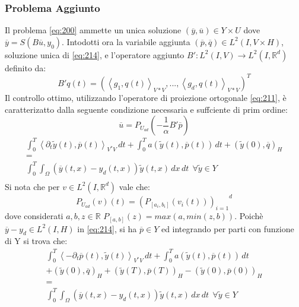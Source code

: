 \subsubsection{Problema Aggiunto}
Il problema \ref{eq:200} ammette un unica soluzione $(\overline{y},\overline{u}){\in}Y{\times}U$ dove $\overline{y}=S(B\overline{u},y_0)$.
Intodotti ora la variabile aggiunta $(\overline{p},\overline{q}) \in L^2(I,V{\times}H)$, soluzione unica di \ref{eq:214}, e l'operatore aggiunto $B':L^2(I,V){\rightarrow}L^2(I,\mathbb{R}^d)$ definito da:
\begin{equation}
B'q(t) = ( \left \langle g_1,q(t) \right \rangle_{V*V}, . . . ,\left \langle g_d,q(t) \right \rangle_{V*V})^T
\label{eq:212}
\end{equation}
Il controllo ottimo, utilizzando l'operatore di proiezione ortogonale \ref{eq:211}, è caratterizatto dalla seguente condizione necessaria e suffciente di prim ordine:
\begin{equation}
\overline{u}=P_{U_{ad}}\left( -\frac{1}{\alpha}B'\overline{p} \right)
\label{eq:213}
\end{equation}
\begin{equation}
\begin{array}{c}
	\int_{0}^{T} \left \langle {\partial_{t}}\tilde{y}(t),\overline{p}(t) \right \rangle_{V^*V} \, dt +  	\int_{0}^{T} a(\tilde{y}(t),\overline{p}(t)) \, dt + (\tilde{y}(0),\overline{q})_H  \\
	 = \\
	\int_{0}^{T} \int_{\Omega} (\overline{y}(t,x)-y_d(t,x))\tilde{y}(t,x) \,dx \, dt  \ \ \forall \tilde{y} \in Y \\
\end{array}
\label{eq:214}
\end{equation}
Si nota che per $v \in L^2(I,\mathbb{R}^d)$ vale che:
\begin{equation}
P_{U_{ad}}(v)(t) = {(P_{[a_i,b_i]}(v_i(t)))_{i=1}}^d
\label{eq:215}
\end{equation}
dove considerati $a,b,z \in \mathbb{R}$ $P_{[a,b]}(z) = max(a,min(z,b))$.
Poichè $\overline{y} - y_d \in L^2(I,H)$ in \ref{eq:214}, si ha $\overline{p} \in Y$ ed integrando per parti con funzione di Y si trova che:
{\renewcommand\arraystretch{2}
\begin{equation}
\begin{array}{c}
	\int_{0}^{T} \left \langle -{\partial_{t}}\overline{p}(t),\tilde{y}(t) \right \rangle_{V^*V} \, dt +  	\int_{0}^{T} a(\tilde{y}(t),\overline{p}(t)) \, dt \\
	+ (\tilde{y}(0),\overline{q})_H + (\tilde{y}(T),\overline{p}(T))_H - (\tilde{y}(0),\overline{p}(0))_H \\
	 = \\
	\int_{0}^{T} \int_{\Omega} (\overline{y}(t,x)-y_d(t,x))\tilde{y}(t,x) \,dx \, dt  \ \ \forall \tilde{y} \in Y \\
\end{array}
\label{eq:216}
\end{equation}
} %
